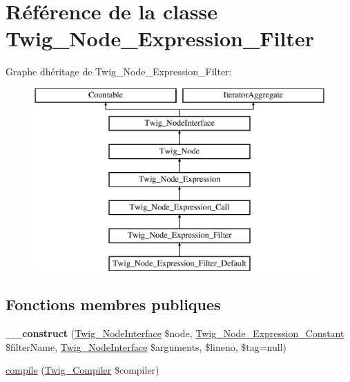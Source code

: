 \hypertarget{class_twig___node___expression___filter}{}\section{Référence de la classe Twig\+\_\+\+Node\+\_\+\+Expression\+\_\+\+Filter}
\label{class_twig___node___expression___filter}
Graphe d\textquotesingle{}héritage de Twig\+\_\+\+Node\+\_\+\+Expression\+\_\+\+Filter\+:\begin{figure}[H]
\begin{center}
\leavevmode
\includegraphics[height=7.000000cm]{class_twig___node___expression___filter}
\end{center}
\end{figure}
\subsection*{Fonctions membres publiques}
\begin{DoxyCompactItemize}
\item 
{\bfseries \+\_\+\+\_\+construct} (\hyperlink{interface_twig___node_interface}{Twig\+\_\+\+Node\+Interface} \$node, \hyperlink{class_twig___node___expression___constant}{Twig\+\_\+\+Node\+\_\+\+Expression\+\_\+\+Constant} \$filter\+Name, \hyperlink{interface_twig___node_interface}{Twig\+\_\+\+Node\+Interface} \$arguments, \$lineno, \$tag=null)\hypertarget{class_twig___node___expression___filter_a71feda7cd9ef9a14a271f02222d6c9b6}{}\label{class_twig___node___expression___filter_a71feda7cd9ef9a14a271f02222d6c9b6}

\item 
\hyperlink{class_twig___node___expression___filter_a4e0faa87c3fae583620b84d3607085da}{compile} (\hyperlink{class_twig___compiler}{Twig\+\_\+\+Compiler} \$compiler)
\end{DoxyCompactItemize}
